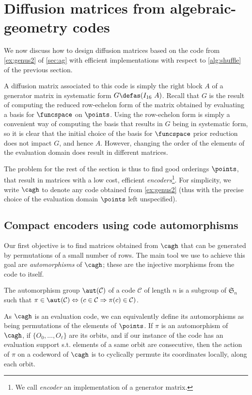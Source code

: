\section{Diffusion matrices from algebraic-geometry codes}
\label{matt}

We now discuss how to design diffusion matrices based on the code from \autoref{ex:genus2} of \autoref{sec:ag}
with efficient implementations with respect to \autoref{alg:shuffle} of the previous section.

A diffusion matrix associated to this code is simply the right block $A$ of a generator matrix in systematic form $G \defas (I_{16}~A)$.
Recall that $G$ is the result of computing the reduced row-echelon form of the matrix obtained by evaluating a basis for $\funcspace$
on $\points$. Using the row-echelon form is simply a convenient way of computing the basis that results in $G$ being in systematic
form, so it is clear that the initial choice of the basis for $\funcspace$ prior reduction does not impact $G$, and hence $A$.
However, changing the order of the elements of the evaluation domain does result in different matrices.

The problem for the rest of the section is thus to find good orderings $\points$,
that result in matrices with a low cost, \ie efficient \emph{encoders}\footnote{We call \emph{encoder} an implementation of a generator matrix.}.
For simplicity, we write $\cagh$ to denote any code obtained from \autoref{ex:genus2} (thus with the precise choice of the evaluation domain $\points$ left unspecified).


\subsection{Compact encoders using code automorphisms}
\label{sec:autos}

Our first objective is to find matrices obtained from $\cagh$ that can be generated by permutations of a small number of rows.
The main tool we use to achieve this goal are \emph{automorphisms} of $\cagh$; these are the injective morphisms from the code to itself.
\begin{defi}
The automorphism group $\aut(\mathcal{C})$ of a code $\mathcal{C}$ of length $n$ is a subgroup of $\mathfrak{S}_n$ such that
$\pi \in \aut(\mathcal{C}) \Leftrightarrow (c \in \mathcal{C} \Rightarrow \pi(c) \in \mathcal{C})$.
\end{defi}

As $\cagh$ is an evaluation code, we can equivalently define its automorphisms as being permutations of the elements of $\points$.
If $\pi$ is an automorphism of $\cagh$, if $\{O_0, \ldots, O_\ell\}$ are its orbits, and if our instance of the code
has an evaluation support s.t. elements of a same orbit are consecutive,
then the action of $\pi$ on a codeword of $\cagh$
is to cyclically permute its coordinates locally, along each orbit.

